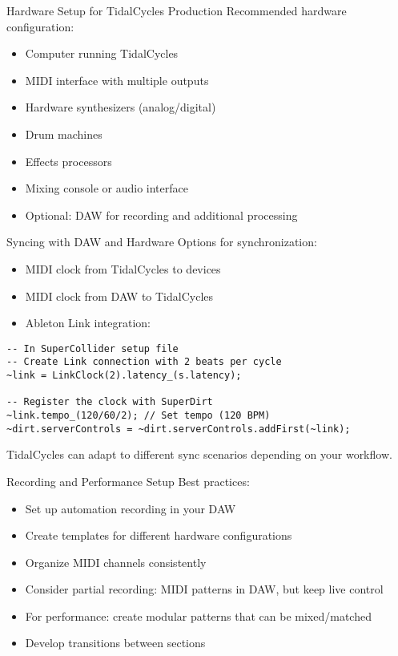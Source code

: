 \documentclass{beamer}
\begin{document}
\begin{frame}{Hardware Setup for TidalCycles Production}
Recommended hardware configuration:
\begin{itemize}
    \item Computer running TidalCycles
    \item MIDI interface with multiple outputs
    \item Hardware synthesizers (analog/digital)
    \item Drum machines
    \item Effects processors
    \item Mixing console or audio interface
    \item Optional: DAW for recording and additional processing
\end{itemize}
\end{frame}

\begin{frame}[fragile]{Syncing with DAW and Hardware}
Options for synchronization:
\begin{itemize}
    \item MIDI clock from TidalCycles to devices
    \item MIDI clock from DAW to TidalCycles
    \item Ableton Link integration:
\end{itemize}
\begin{lstlisting}[style=tidal]
-- In SuperCollider setup file
-- Create Link connection with 2 beats per cycle
~link = LinkClock(2).latency_(s.latency);
    
-- Register the clock with SuperDirt
~link.tempo_(120/60/2); // Set tempo (120 BPM)
~dirt.serverControls = ~dirt.serverControls.addFirst(~link);
\end{lstlisting}
TidalCycles can adapt to different sync scenarios depending on your workflow.
\end{frame}

\begin{frame}[fragile]{Recording and Performance Setup}
Best practices:
\begin{itemize}
    \item Set up automation recording in your DAW
    \item Create templates for different hardware configurations
    \item Organize MIDI channels consistently
    \item Consider partial recording: MIDI patterns in DAW, but keep live control
    \item For performance: create modular patterns that can be mixed/matched
    \item Develop transitions between sections
\end{itemize}
\end{frame}
\end{document}
